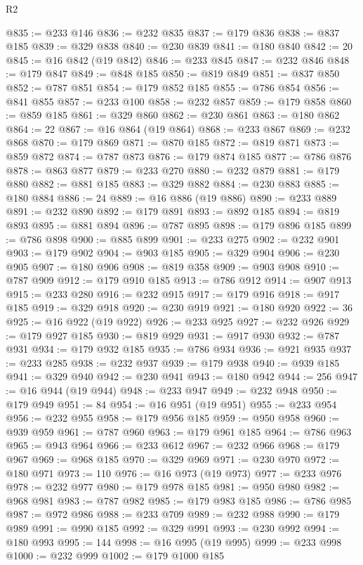 \begin{lexlean}{R2}
\begin{coremodule}
@835 := @233 @146
@836 := @232 @835
@837 := @179 @836
@838 := @837 @185
@839 := @329 @838
@840 := @230 @839
@841 := @180 @840
@842 := 20
@845 := @16 @842 (@19 @842)
@846 := @233 @845
@847 := @232 @846
@848 := @179 @847
@849 := @848 @185
@850 := @819 @849
@851 := @837 @850
@852 := @787 @851
@854 := @179 @852 @185
@855 := @786 @854
@856 := @841 @855
@857 := @233 @100
@858 := @232 @857
@859 := @179 @858
@860 := @859 @185
@861 := @329 @860
@862 := @230 @861
@863 := @180 @862
@864 := 22
@867 := @16 @864 (@19 @864)
@868 := @233 @867
@869 := @232 @868
@870 := @179 @869
@871 := @870 @185
@872 := @819 @871
@873 := @859 @872
@874 := @787 @873
@876 := @179 @874 @185
@877 := @786 @876
@878 := @863 @877
@879 := @233 @270
@880 := @232 @879
@881 := @179 @880
@882 := @881 @185
@883 := @329 @882
@884 := @230 @883
@885 := @180 @884
@886 := 24
@889 := @16 @886 (@19 @886)
@890 := @233 @889
@891 := @232 @890
@892 := @179 @891
@893 := @892 @185
@894 := @819 @893
@895 := @881 @894
@896 := @787 @895
@898 := @179 @896 @185
@899 := @786 @898
@900 := @885 @899
@901 := @233 @275
@902 := @232 @901
@903 := @179 @902
@904 := @903 @185
@905 := @329 @904
@906 := @230 @905
@907 := @180 @906
@908 := @819 @358
@909 := @903 @908
@910 := @787 @909
@912 := @179 @910 @185
@913 := @786 @912
@914 := @907 @913
@915 := @233 @280
@916 := @232 @915
@917 := @179 @916
@918 := @917 @185
@919 := @329 @918
@920 := @230 @919
@921 := @180 @920
@922 := 36
@925 := @16 @922 (@19 @922)
@926 := @233 @925
@927 := @232 @926
@929 := @179 @927 @185
@930 := @819 @929
@931 := @917 @930
@932 := @787 @931
@934 := @179 @932 @185
@935 := @786 @934
@936 := @921 @935
@937 := @233 @285
@938 := @232 @937
@939 := @179 @938
@940 := @939 @185
@941 := @329 @940
@942 := @230 @941
@943 := @180 @942
@944 := 256
@947 := @16 @944 (@19 @944)
@948 := @233 @947
@949 := @232 @948
@950 := @179 @949
@951 := 84
@954 := @16 @951 (@19 @951)
@955 := @233 @954
@956 := @232 @955
@958 := @179 @956 @185
@959 := @950 @958
@960 := @939 @959
@961 := @787 @960
@963 := @179 @961 @185
@964 := @786 @963
@965 := @943 @964
@966 := @233 @612
@967 := @232 @966
@968 := @179 @967
@969 := @968 @185
@970 := @329 @969
@971 := @230 @970
@972 := @180 @971
@973 := 110
@976 := @16 @973 (@19 @973)
@977 := @233 @976
@978 := @232 @977
@980 := @179 @978 @185
@981 := @950 @980
@982 := @968 @981
@983 := @787 @982
@985 := @179 @983 @185
@986 := @786 @985
@987 := @972 @986
@988 := @233 @709
@989 := @232 @988
@990 := @179 @989
@991 := @990 @185
@992 := @329 @991
@993 := @230 @992
@994 := @180 @993
@995 := 144
@998 := @16 @995 (@19 @995)
@999 := @233 @998
@1000 := @232 @999
@1002 := @179 @1000 @185

\end{coremodule}
\end{lexlean}
